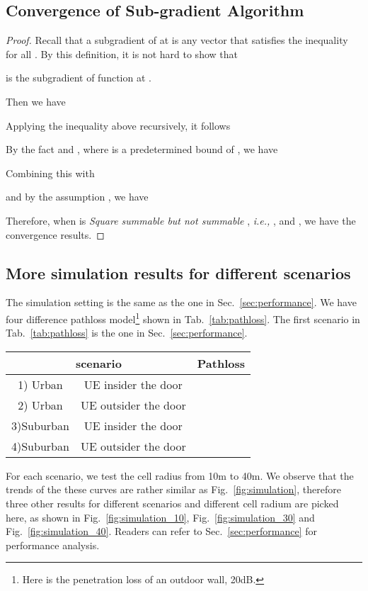 \documentclass[conference]{IEEEtran}
\newcommand{\ie}{\emph{i.e., }}
\begin{document}
\subsection{Convergence of Sub-gradient Algorithm}
\begin{proof}
Recall that a subgradient of  at  is any vector  that satisfies the inequality  for all . By this definition, it is not hard to show that

is the subgradient of function  at .

Then we have

Applying the inequality above recursively, it follows

By the fact  and , where  is a predetermined bound of , we have

Combining this with

and by the assumption , we have

Therefore, when  is \emph{Square summable but not summable} , \ie
, and , we have the convergence results.
\end{proof}

\subsection{More simulation results for different scenarios}
The simulation setting is the same as the one in Sec.~\ref{sec:performance}. We have four difference pathloss model\footnote{Here  is the penetration loss of an outdoor wall, 20dB.}  shown in Tab.~\ref{tab:pathloss}. The first scenario in Tab.~\ref{tab:pathloss} is the one in Sec.~\ref{sec:performance}.
\begin{table*}[htb]
\centering
\begin{tabular}{|c|c|c|}
\hline
 \multicolumn{2}{|c|}{scenario}& Pathloss\\
\hline
1) Urban & UE insider the door& \\
\hline
2) Urban & UE outsider the door& \\
\hline
3)Suburban&  UE insider the door& \\
\hline
4)Suburban&  UE outsider the door& \\
\hline
\end{tabular}
\caption{Pathloss model for different indoor small cell scenario}
\label{tab:pathloss}
\end{table*}

For each scenario, we test the cell radius from 10m to 40m. We observe that the trends of the these curves are rather similar as Fig.~\ref{fig:simulation}, therefore three other results for different scenarios and different cell radium are picked here, as shown  in Fig.~\ref{fig:simulation_10}, Fig.~\ref{fig:simulation_30} and Fig.~\ref{fig:simulation_40}. Readers can refer to Sec.~\ref{sec:performance} for performance analysis.
\end{document}
